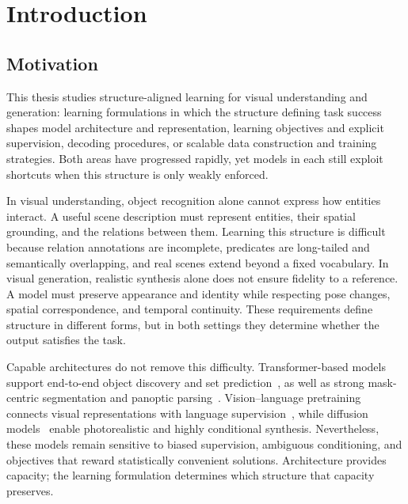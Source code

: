 
\chapter{Introduction}

\section{Motivation}
This thesis studies structure-aligned learning for visual understanding and generation: learning formulations in which the structure defining task success shapes model architecture and representation, learning objectives and explicit supervision, decoding procedures, or scalable data construction and training strategies. Both areas have progressed rapidly, yet models in each still exploit shortcuts when this structure is only weakly enforced.

In visual understanding, object recognition alone cannot express how entities interact. A useful scene description must represent entities, their spatial grounding, and the relations between them. Learning this structure is difficult because relation annotations are incomplete, predicates are long-tailed and semantically overlapping, and real scenes extend beyond a fixed vocabulary. In visual generation, realistic synthesis alone does not ensure fidelity to a reference. A model must preserve appearance and identity while respecting pose changes, spatial correspondence, and temporal continuity. These requirements define structure in different forms, but in both settings they determine whether the output satisfies the task.

Capable architectures do not remove this difficulty. Transformer-based models~\citep{vaswani2017attention} support end-to-end object discovery and set prediction~\citep{carion2020end}, as well as strong mask-centric segmentation and panoptic parsing~\citep{cheng2022masked}. Vision--language pretraining connects visual representations with language supervision~\citep{radford2021learning}, while diffusion models~\citep{ho2020denoising, rombach2022high} enable photorealistic and highly conditional synthesis. Nevertheless, these models remain sensitive to biased supervision, ambiguous conditioning, and objectives that reward statistically convenient solutions. Architecture provides capacity; the learning formulation determines which structure that capacity preserves.

